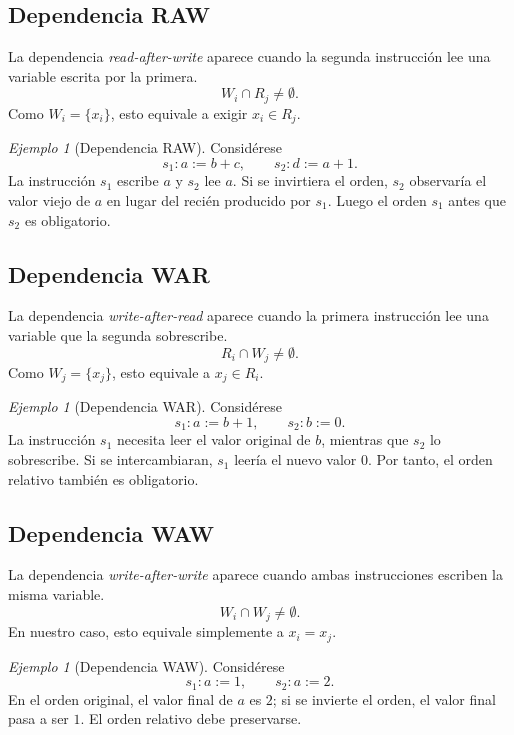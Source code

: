 \documentclass[letterpaper,oneside]{article}
\theoremstyle{remark}
\newtheorem{example}[definition]{Ejemplo}
\newcommand{\reads}[1]{R_{#1}}
\newcommand{\writes}[1]{W_{#1}}
\begin{document}
\subsection{Dependencia RAW}

La dependencia \emph{read-after-write} aparece cuando la segunda instrucción lee una variable escrita por la primera.
\[
  \writes{i} \cap \reads{j} \neq \emptyset.
\]
Como $\writes{i}=\{x_i\}$, esto equivale a exigir $x_i \in \reads{j}$.

\begin{example}[Dependencia RAW]
Considérese
\[
  s_1 : a := b + c,
  \qquad
  s_2 : d := a + 1.
\]
La instrucción $s_1$ escribe $a$ y $s_2$ lee $a$. Si se invirtiera el orden, $s_2$ observaría el valor viejo de $a$ en lugar del recién producido por $s_1$. Luego el orden $s_1$ antes que $s_2$ es obligatorio.
\end{example}

\subsection{Dependencia WAR}

La dependencia \emph{write-after-read} aparece cuando la primera instrucción lee una variable que la segunda sobrescribe.
\[
  \reads{i} \cap \writes{j} \neq \emptyset.
\]
Como $\writes{j}=\{x_j\}$, esto equivale a $x_j \in \reads{i}$.

\begin{example}[Dependencia WAR]
Considérese
\[
  s_1 : a := b + 1,
  \qquad
  s_2 : b := 0.
\]
La instrucción $s_1$ necesita leer el valor original de $b$, mientras que $s_2$ lo sobrescribe. Si se intercambiaran, $s_1$ leería el nuevo valor $0$. Por tanto, el orden relativo también es obligatorio.
\end{example}

\subsection{Dependencia WAW}

La dependencia \emph{write-after-write} aparece cuando ambas instrucciones escriben la misma variable.
\[
  \writes{i} \cap \writes{j} \neq \emptyset.
\]
En nuestro caso, esto equivale simplemente a $x_i = x_j$.

\begin{example}[Dependencia WAW]
Considérese
\[
  s_1 : a := 1,
  \qquad
  s_2 : a := 2.
\]
En el orden original, el valor final de $a$ es $2$; si se invierte el orden, el valor final pasa a ser $1$. El orden relativo debe preservarse.
\end{example}
\end{document}
